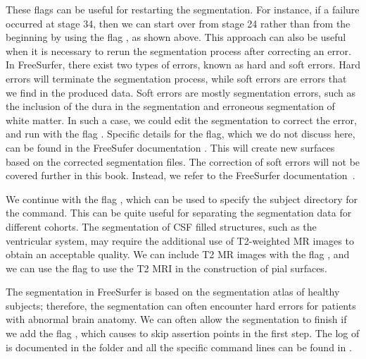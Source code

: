 These flags can be useful for restarting the segmentation. For
instance, if a failure occurred at stage 34, then we can start over
from stage 24 rather than from the beginning by using the flag
, as shown above. This approach can also be useful when it is
necessary to rerun the segmentation process after correcting an
error. In FreeSurfer, there exist two types of errors, known as hard
and soft errors. Hard errors will terminate the segmentation process,
while soft errors are errors that we find in the produced data. Soft
errors are mostly segmentation errors, such as the inclusion of the
dura in the segmentation and erroneous segmentation of white
matter. In such a case, we could edit the segmentation to correct the error, 
and run  with the flag .  Specific details 
for the  flag, which we do not discuss here, can be found 
in the FreeSufer documentation \cite{freesurfer-wiki}.  This will create new 
surfaces based on the corrected segmentation files. The correction of soft 
errors will not be covered further in this book. Instead, we refer to the 
FreeSurfer documentation~\cite{freesurfer-wiki}.

%
%
We continue with the flag , which can be used to specify the
subject directory for the  command. This can be quite
useful for separating the segmentation data for different
cohorts. The segmentation of CSF filled structures, such as the
ventricular system, may require the additional use of T2-weighted MR
images to obtain an acceptable quality. We can include T2 MR images with the
flag , and we can use the flag  to use
the T2 MRI in the construction of pial surfaces.

The segmentation in FreeSurfer is based on the segmentation atlas of
healthy subjects; therefore, the segmentation can often encounter hard
errors for patients with abnormal brain anatomy. We can often allow
the segmentation to finish if we add the flag ,
which causes  to skip assertion points in the first step. The
log of  is documented in the folder 
and all the specific command lines can be found in .



